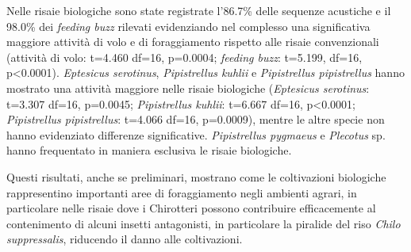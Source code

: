 {Nelle risaie biologiche sono state registrate l’86.7\% delle sequenze acustiche e il 98.0\% dei \textit{feeding buzz} rilevati evidenziando nel complesso una significativa maggiore attività di volo e di foraggiamento rispetto alle risaie convenzionali (attività di volo: t=4.460 df=16, p=0.0004; \textit{feeding buzz}: t=5.199, df=16, p<0.0001). \emph{Eptesicus serotinus}, \emph{Pipistrellus kuhlii} e \emph{Pipistrellus pipistrellus} hanno mostrato una attività maggiore nelle risaie biologiche (\emph{Eptesicus serotinus}: t=3.307 df=16, p=0.0045; \emph{Pipistrellus kuhlii}: t=6.667 df=16, p<0.0001; \emph{Pipistrellus pipistrellus}: t=4.066 df=16, p=0.0009), mentre le altre specie non hanno evidenziato differenze significative. \emph{Pipistrellus pygmaeus} e \emph{Plecotus} sp. hanno frequentato in maniera esclusiva le risaie biologiche.

Questi risultati, anche se preliminari, mostrano come le coltivazioni biologiche rappresentino importanti aree di foraggiamento negli ambienti agrari, in particolare nelle risaie dove i Chirotteri possono contribuire efficacemente al contenimento di alcuni insetti  antagonisti, in particolare la piralide del riso \emph{Chilo suppressalis}, riducendo il danno alle coltivazioni. 
} %